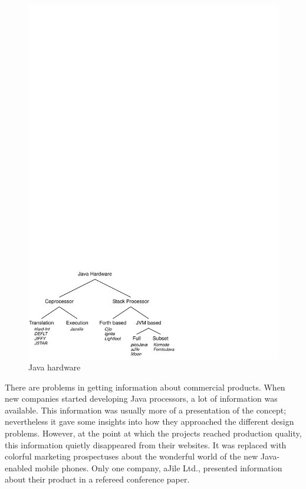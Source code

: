\begin{figure}
    \centering
    \includegraphics[scale=\picscale]{related/related_tree}
    \caption{Java hardware}
    \label{fig_related_tree}
\end{figure}


There are problems in getting information about commercial products.
When new companies started developing Java processors, a lot of
information was available. This information was usually more of a
presentation of the concept; nevertheless it gave some insights into
how they approached the different design problems. However, at the
point at which the projects reached production quality, this
information quietly disappeared from their websites. It was replaced
with colorful marketing prospectuses about the wonderful world of the
new Java-enabled mobile phones. Only one company, aJile Ltd.,
presented information about their product in a refereed conference
paper.


